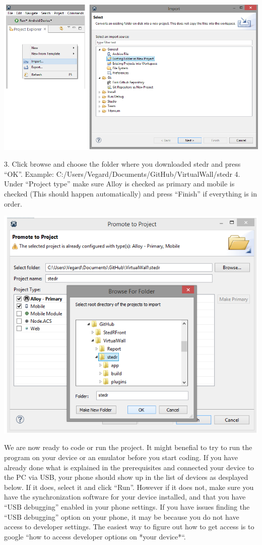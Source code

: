\begin{center}
\includegraphics[scale=0.45]{guide/f2.png} 
\end{center}

3. Click browse and choose the folder where you downloaded stedr and press “OK”. 
Example: C:/Users/Vegard/Documents/GitHub/VirtualWall/stedr
4. Under “Project type” make sure Alloy is checked as primary and mobile is checked (This should happen automatically) and press “Finish” if everything is in order.

\begin{center}
\includegraphics[scale=0.45]{guide/f3.png} 
\end{center}

We are now ready to code or run the project. It might benefial to try to run the program on your device or an emulator before you start coding. If you have already done what is explained in the prerequisites and connected your device to the PC via USB, your phone should show up in the list of devices as desplayed below. If it does, select it and click “Run”. However if it does not, make sure you have the synchronization software for your device installed, and that you have “USB debugging” enabled in your phone settings. If you have issues finding the “USB debugging” option on your phone, it may be because you do not have access to developer settings. The easiest way to figure out how to get access is to google “how to access developer options on *your device*“.

